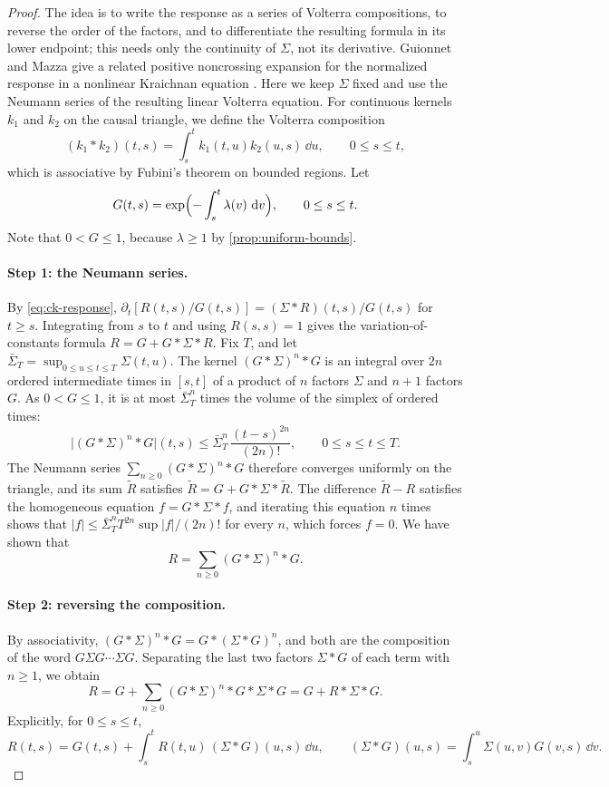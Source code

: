 \begin{proof}
The idea is to write the response as a series of Volterra compositions, to reverse the order of the factors, and to differentiate the resulting formula in its lower endpoint; this needs only the continuity of $\Sigma$, not its derivative. Guionnet and Mazza give a related positive noncrossing expansion for the normalized response in a nonlinear Kraichnan equation \cite[arXiv version~1, Section~2.1 and Lemma~2.1, pp.~7--8]{guionnetmazza2005}. Here we keep $\Sigma$ fixed and use the Neumann series of the resulting linear Volterra equation.
For continuous kernels $k_1$ and $k_2$ on the causal triangle, we define the Volterra composition
\[
 (k_1*k_2)(t,s)=\int_s^tk_1(t,u)k_2(u,s)\,\dd u,\qquad 0\le s\le t,
\]
which is associative by Fubini's theorem on bounded regions. Let
\[
 G(t,s)=\exp\Bigl(-\int_s^t\lambda(v)\,\mathop{}\!\mathrm d v\Bigr),\qquad 0\le s\le t.
\]
Note that $0<G\le1$, because $\lambda\ge1$ by \cref{prop:uniform-bounds}.

\paragraph{Step 1: the Neumann series.}
By \eqref{eq:ck-response}, $\partial_t[R(t,s)/G(t,s)]=(\Sigma*R)(t,s)/G(t,s)$ for $t\ge s$. Integrating from $s$ to $t$ and using $R(s,s)=1$ gives the variation-of-constants formula $R=G+G*\Sigma*R$. Fix $T$, and let $\bar\Sigma_T=\sup_{0\le u\le t\le T}\Sigma(t,u)$. The kernel $(G*\Sigma)^n*G$ is an integral over $2n$ ordered intermediate times in $[s,t]$ of a product of $n$ factors $\Sigma$ and $n+1$ factors $G$. As $0<G\le1$, it is at most $\bar\Sigma_T^n$ times the volume of the simplex of ordered times:
\[
 \bigl|(G*\Sigma)^n*G\bigr|(t,s)\le\bar\Sigma_T^n\,\frac{(t-s)^{2n}}{(2n)!},\qquad 0\le s\le t\le T.
\]
The Neumann series $\sum_{n\ge0}(G*\Sigma)^n*G$ therefore converges uniformly on the triangle, and its sum $\tilde R$ satisfies $\tilde R=G+G*\Sigma*\tilde R$. The difference $\tilde R-R$ satisfies the homogeneous equation $f=G*\Sigma*f$, and iterating this equation $n$ times shows that $|f|\le\bar\Sigma_T^nT^{2n}\sup|f|/(2n)!$ for every $n$, which forces $f=0$. We have shown that
\[
 R=\sum_{n\ge0}(G*\Sigma)^n*G.
\]

\paragraph{Step 2: reversing the composition.}
By associativity, $(G*\Sigma)^n*G=G*(\Sigma*G)^n$, and both are the composition of the word $G\Sigma G\cdots\Sigma G$. Separating the last two factors $\Sigma*G$ of each term with $n\ge1$, we obtain
\[
 R=G+\sum_{n\ge0}(G*\Sigma)^n*G*\Sigma*G=G+R*\Sigma*G.
\]
Explicitly, for $0\le s\le t$,
\[
 R(t,s)=G(t,s)+\int_s^tR(t,u)\,(\Sigma*G)(u,s)\,\dd u,\qquad
 (\Sigma*G)(u,s)=\int_s^u\Sigma(u,v)G(v,s)\,\dd v.
\]


\end{proof}
